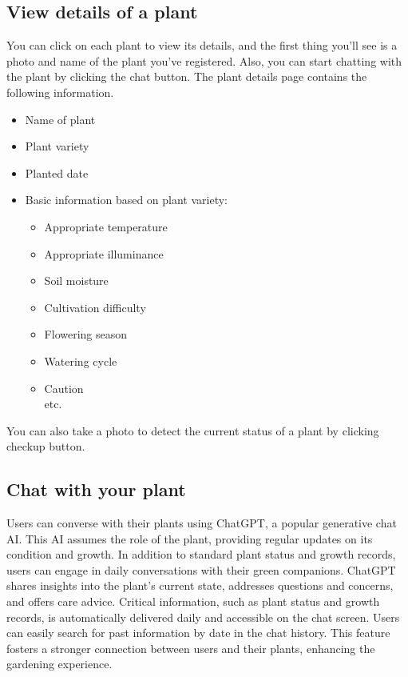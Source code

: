\documentclass[conference, a4paper]{IEEEtran}
\begin{document}
\subsection{View details of a plant}
You can click on each plant to view its details, and the first thing you'll see is a photo and name of the plant you've registered. Also, you can start chatting with the plant by clicking the chat button. The plant details page contains the following information.
\begin{itemize}
    \item Name of plant
    \item Plant variety
    \item Planted date
    \item Basic information based on plant variety:
    \begin{itemize}
        \item Appropriate temperature
        \item Appropriate illuminance
        \item Soil moisture
        \item Cultivation difficulty
        \item Flowering season
        \item Watering cycle
        \item Caution
        \\etc.
    \end{itemize}
\end{itemize}
You can also take a photo to detect the current status of a plant by clicking checkup button.\\
\subsection{Chat with your plant}
Users can converse with their plants using ChatGPT, a popular generative chat AI. This AI assumes the role of the plant, providing regular updates on its condition and growth. In addition to standard plant status and growth records, users can engage in daily conversations with their green companions. ChatGPT shares insights into the plant's current state, addresses questions and concerns, and offers care advice. Critical information, such as plant status and growth records, is automatically delivered daily and accessible on the chat screen. Users can easily search for past information by date in the chat history. This feature fosters a stronger connection between users and their plants, enhancing the gardening experience.\\
\end{document}
